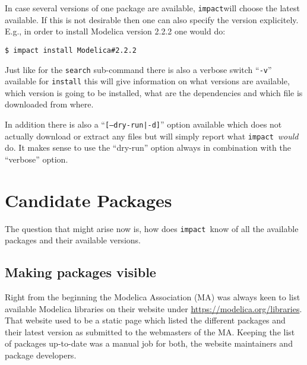 \documentclass[11pt,a4paper,twocolumn]{article}
\newcommand{\impact}{\texttt{impact}} %
\newcommand{\code}[1]{\texttt{#1}} %
\begin{document}
In case several versions of one package are available, \impact will choose
the latest available. If this is not desirable then one can also specify the
version explicitely. E.g., in order to install Modelica version 2.2.2
one would do:
\begin{verbatim}
$ impact install Modelica#2.2.2
\end{verbatim}

Just like for the \code{search} sub-command there is also a verbose switch
``\code{-v}'' available for \code{install} this will give information on what
versions are available, which version is going to be installed, what are the
dependencies and which file is downloaded from where.

In addition there is also a ``\code{[--dry-run|-d]}'' option available which
does not actually download or extract any files but will simply report what
\impact\ \emph{would} do.
It makes sense to use the ``dry-run'' option always in combination with the
``verbose'' option.



\section{Candidate Packages}
\label{sec:candidates}

The question that might arise now is, how does \impact\ know of all the
available packages and their available versions.

\subsection{Making packages visible}
\label{sec:collection}
Right from the beginning the Modelica Association (MA) was always keen to list
available Modelica libraries on their website under
\url{https://modelica.org/libraries}.
That website used to be a static page which listed the different packages and
their latest version as submitted to the webmasters of the MA.
Keeping the list of packages up-to-date was a manual job for both, the website
maintainers and package developers.
\end{document}
